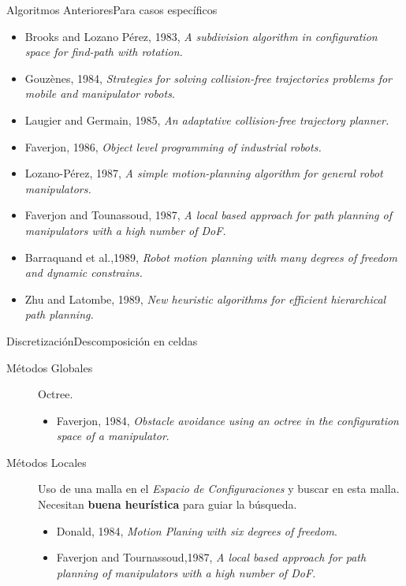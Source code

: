 \documentclass{beamer}
\begin{document}
\begin{frame}{Algoritmos Anteriores}{Para casos específicos}
	\begin{itemize}
		\item Brooks and Lozano Pérez, 1983, \textit{A subdivision algorithm in configuration space for find-path with rotation.}
		\item Gouzènes, 1984, \textit{Strategies for solving collision-free trajectories problems for mobile and manipulator robots.}
		\item Laugier and Germain, 1985, \textit{An adaptative collision-free trajectory planner.}
		\item Faverjon, 1986, \textit{Object level programming of industrial robots.}
		\item Lozano-Pérez, 1987, \textit{A simple motion-planning algorithm for general robot manipulators.}
		\item Faverjon and Tounassoud, 1987, \textit{A local based approach for path planning of manipulators with a high number of DoF.}
		\item  Barraquand et al.,1989, \textit{Robot motion planning with many degrees of freedom and dynamic constrains.}
		\item Zhu and Latombe, 1989, \textit{New heuristic algorithms for efficient hierarchical path planning.}
	\end{itemize}
\end{frame}

\begin{frame}{Discretización}{Descomposición en celdas}
\begin{description}
\item[Métodos Globales] Octree.
	\begin{itemize}
	\item Faverjon, 1984, \textit{Obstacle avoidance using an octree in the configuration space of a manipulator}.
	\end{itemize}
\item[Métodos Locales] Uso de una malla en el \textit{Espacio de Configuraciones} y buscar en esta malla. Necesitan \textbf{buena heurística} para guiar la búsqueda.
	\begin{itemize}
		\item Donald, 1984, \textit{Motion Planing with six degrees of freedom}.
		\item Faverjon and Tournassoud,1987, \textit{A local based approach for path planning of manipulators with a high number of DoF.} 
	\end{itemize}
\end{description}
\end{frame}
\end{document}
